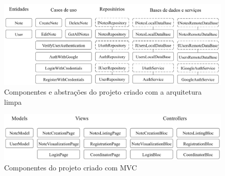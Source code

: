 \begin{figure}[ht]
	\centering
	\includegraphics[width=1\textwidth]{images/project_clean_arch.png}
	\caption{Componentes e abstrações do projeto criado com a arquitetura limpa}
	\label{fig:project_clean_arch}
\end{figure}
\begin{figure}[ht]
	\centering
	\includegraphics[width=1\textwidth]{images/project_mvc.png}
	\caption{Componentes do projeto criado com MVC}
	\label{fig:project_mvc}
\end{figure}


\clearpage
